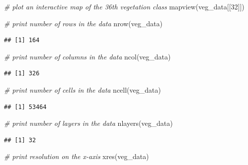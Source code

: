 \documentclass[
  12pt,
]{book}
\newenvironment{Shaded}{\begin{snugshade}}{\end{snugshade}}
\newcommand{\CommentTok}[1]{\textcolor[rgb]{0.56,0.35,0.01}{\textit{#1}}}
\newcommand{\DecValTok}[1]{\textcolor[rgb]{0.00,0.00,0.81}{#1}}
\newcommand{\FunctionTok}[1]{\textcolor[rgb]{0.00,0.00,0.00}{#1}}
\newcommand{\NormalTok}[1]{#1}
\begin{document}
\begin{Shaded}
\begin{Highlighting}[]
\CommentTok{\# plot an interactive map of the 36th vegetation class}
\FunctionTok{mapview}\NormalTok{(veg\_data[[}\DecValTok{32}\NormalTok{]])}
\end{Highlighting}
\end{Shaded}

\begin{Shaded}
\begin{Highlighting}[]
\CommentTok{\# print number of rows in the data}
\FunctionTok{nrow}\NormalTok{(veg\_data)}
\end{Highlighting}
\end{Shaded}

\begin{verbatim}
## [1] 164
\end{verbatim}

\begin{Shaded}
\begin{Highlighting}[]
\CommentTok{\# print number of columns  in the data}
\FunctionTok{ncol}\NormalTok{(veg\_data)}
\end{Highlighting}
\end{Shaded}

\begin{verbatim}
## [1] 326
\end{verbatim}

\begin{Shaded}
\begin{Highlighting}[]
\CommentTok{\# print number of cells in the data}
\FunctionTok{ncell}\NormalTok{(veg\_data)}
\end{Highlighting}
\end{Shaded}

\begin{verbatim}
## [1] 53464
\end{verbatim}

\begin{Shaded}
\begin{Highlighting}[]
\CommentTok{\# print number of layers in the data}
\FunctionTok{nlayers}\NormalTok{(veg\_data)}
\end{Highlighting}
\end{Shaded}

\begin{verbatim}
## [1] 32
\end{verbatim}

\begin{Shaded}
\begin{Highlighting}[]
\CommentTok{\# print  resolution on the x{-}axis}
\FunctionTok{xres}\NormalTok{(veg\_data)}
\end{Highlighting}
\end{Shaded}
\end{document}
